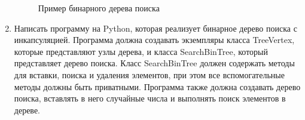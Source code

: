 \begin{enumerate}
\begin{figure}[h]
\centering
{}
\caption{Пример бинарного дерева поиска}
\end{figure}

\item Написать программу на Python, которая реализует бинарное дерево поиска с инкапсуляцией. Программа должна создавать экземпляры класса TreeVertex, которые представляют узлы дерева, и класса SearchBinTree, который представляет дерево поиска. Класс SearchBinTree должен содержать методы для вставки, поиска и удаления элементов, при этом все вспомогательные методы должны быть приватными. Программа также должна создавать дерево поиска, вставлять в него случайные числа и выполнять поиск элементов в дереве.


\end{enumerate}
